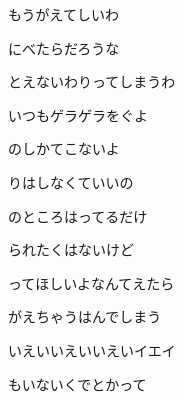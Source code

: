 \documentclass[a4paper,tate,twocolumn,12pt]{ltjtarticle}
\begin{document}
\begin{flushleft}
\vspace{2em}

\noindent\begin{minipage}{\linewidth}
もうがえてしいわ

にべたらだろうな

とえないわりってしまうわ

いつもゲラゲラをぐよ

のしかてこないよ

りはしなくていいの

のところはってるだけ
\end{minipage}

\vspace{2em}

\noindent\begin{minipage}{\linewidth}
られたくはないけど

ってほしいよなんてえたら

がえちゃうはんでしまう

いえいいえいいえいイエイ

もいないくでとかって

\end{minipage}

\end{flushleft}
\end{document}
